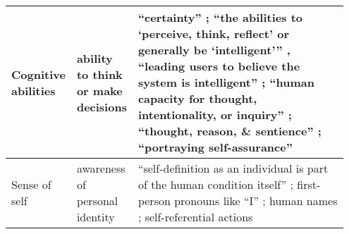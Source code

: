 \documentclass[11pt]{article}
\newcommand{\cb}{behaviors}
\begin{document}
\begin{table*}[th!]
\begin{tabular}{|p{0.1\linewidth}|p{0.1\linewidth}|p{0.75\linewidth}|}
Cognitive abilities                 & ability to think or make decisions                 & ``certainty'' \cite{Kim2024-sv}; ``the abilities to `perceive, think, reflect' or generally be `intelligent''' \cite{Inie2024-dy}, ``leading users to believe the system is intelligent'' \cite{Araujo2018-ij}; ``human capacity for thought, intentionality, or inquiry'' \cite{disalvo2005imitating}; ``thought, reason, \& sentience'' \cite{abercrombie-etal-2023-mirages}; ``portraying self-assurance'' \cite{Emnett2024-na}                      \\\hline
Sense of self              & awareness of personal identity                    & ``self-definition as an individual is part of the human condition itself'' \cite{abercrombie-etal-2023-mirages}; first-person pronouns like ``I'' \citep{gros-etal-2022-robots,cohn2024believing}; human names \citep{Araujo2018-ij,Maeda2024-cv}; self-referential actions \citep{Glaese2022-qo} \\\hline                                                                                       
\end{tabular}
 \caption{\textbf{Anthropomorphic \cb~identified in prior work.} Categories of anthropomorphic \cb~presented to participants in our crowdsourcing study.  }

    \label{tab:priorbehaviorsfull}
\end{table*}
\end{document}
